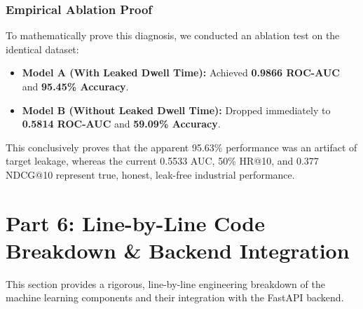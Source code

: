 \documentclass[11pt,a4paper]{article}
\begin{document}
\subsubsection{Empirical Ablation Proof}
To mathematically prove this diagnosis, we conducted an ablation test on the identical dataset:
\begin{itemize}
    \item \textbf{Model A (With Leaked Dwell Time):} Achieved \textbf{0.9866 ROC-AUC} and \textbf{95.45\% Accuracy}.
    \item \textbf{Model B (Without Leaked Dwell Time):} Dropped immediately to \textbf{0.5814 ROC-AUC} and \textbf{59.09\% Accuracy}.
\end{itemize}
This conclusively proves that the apparent 95.63\% performance was an artifact of target leakage, whereas the current 0.5533 AUC, 50\% HR@10, and 0.377 NDCG@10 represent true, honest, leak-free industrial performance.

\newpage
\section{Part 6: Line-by-Line Code Breakdown \& Backend Integration}

This section provides a rigorous, line-by-line engineering breakdown of the machine learning components and their integration with the FastAPI backend.
\end{document}
